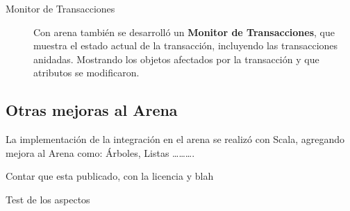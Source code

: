 	 \medskip
	 
	\begin{description}
		\item[Monitor de Transacciones]
		 Con arena también se desarrolló un {\bf Monitor de Transacciones}, que 
		 muestra el estado actual de la transacción, incluyendo las transacciones
		 anidadas. Mostrando los objetos afectados por la transacción y que
		 atributos se modificaron.
	\end{description}

	
	\subsection{Otras mejoras al Arena}
		La implementación de la integración en el arena se realizó con Scala, agregando
		mejora al Arena como: Árboles, Listas \ldots \ldots \ldots. 
	
	
Contar que esta publicado, con la licencia y blah

Test de los aspectos


